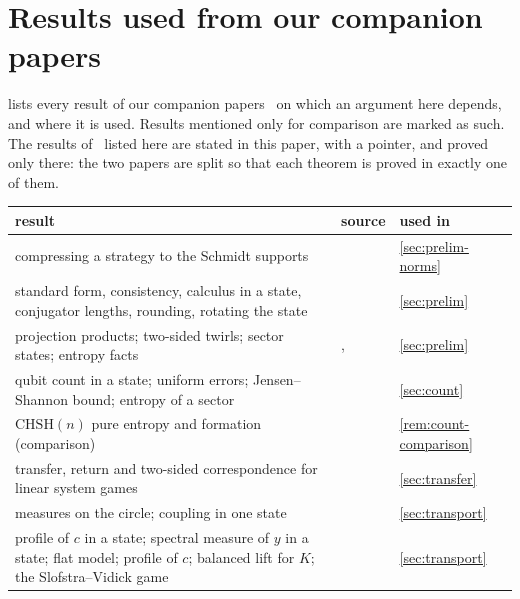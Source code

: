 \section{Results used from our companion papers}\label{app:companion}

 lists every result of our companion papers~\cite{DM-game,DM-lamps,DM-H3,DM-ID,Dou26} on which an argument
here depends, and where it is used. Results mentioned only for comparison are marked as such. The results of~\cite{DM-game} listed
here are stated in this paper, with a pointer, and proved only there: the two papers are split so that each theorem is proved in
exactly one of them.

{\small
\begin{longtable}{@{}L{0.45\textwidth}L{0.21\textwidth}L{0.26\textwidth}@{}}
\toprule
result & source & used in\\
\midrule
\endhead
compressing a strategy to the Schmidt supports & \cite[Rem.~2.9]{DM-game} & \cref{sec:prelim-norms}\\
standard form, consistency, calculus in a state, conjugator lengths, rounding, rotating the state & \cite[Lemmas~3.1--3.4,
3.6, 3.7]{DM-game} & \cref{sec:prelim}\\
projection products; two-sided twirls; sector states; entropy facts & \cite[Lemmas~3.8--3.10, \S3.7]{DM-game},
\cite[Lemma~4.1]{DM-H3} & \cref{sec:prelim}\\
qubit count in a state; uniform errors; Jensen--Shannon bound; entropy of a sector & \cite[Thm.~4.1, Cor.~4.2, Lemmas~4.8,
4.9]{DM-game} & \cref{sec:count}\\
$\mathrm{CHSH}(n)$ pure entropy and formation (comparison) & \cite[Thm.~E]{DM-game} & \cref{rem:count-comparison}\\
transfer, return and two-sided correspondence for linear system games & \cite[Thms.~5.1, 5.4, Cor.~5.5]{DM-game} &
\cref{sec:transfer}\\
\midrule
measures on the circle; coupling in one state & \cite[Lemmas~11.7, 11.8]{DM-game} & \cref{sec:transport}\\
profile of $c$ in a state; spectral measure of $y$ in a state; flat model; profile of $c$; balanced lift for $K$; the
Slofstra--Vidick game & \cite[Thm.~11.9, Prop.~11.10, Ex.~11.11, Cor.~11.12, Lemma~11.13, Thm.~11.14]{DM-game} &
\cref{sec:transport}\\

\end{longtable}}
